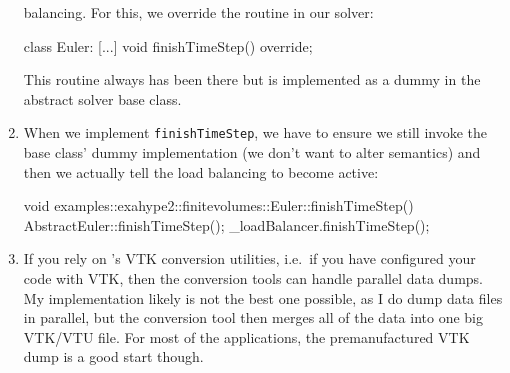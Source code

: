 \begin{enumerate}
  balancing. For this, we override the routine in our solver:
  \begin{code}
class Euler: [...]
    void finishTimeStep() override;
  \end{code}
  This routine always has been there but is implemented as a dummy in the
  abstract solver base class.
  \item When we implement \texttt{finishTimeStep}, we have to ensure we still
  invoke the base class' dummy implementation (we don't want to alter semantics)
  and then we actually tell the load balancing to become active:
  \begin{code}
void examples::exahype2::finitevolumes::Euler::finishTimeStep() {
  AbstractEuler::finishTimeStep();
  _loadBalancer.finishTimeStep(); 
}
  \end{code}
  \item If you rely on \Peano's VTK conversion utilities, i.e.~if you have
  configured your code with VTK, then the conversion tools can handle parallel
  data dumps. My implementation likely is not the best one possible, as I do
  dump data files in parallel, but the conversion tool then merges all of the
  data into one big VTK/VTU file. For most of the applications, the
  premanufactured VTK dump is a good start though.
\end{enumerate}

